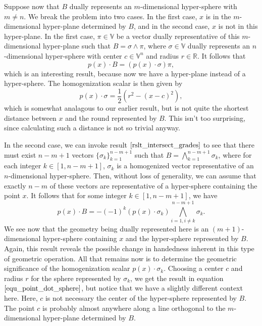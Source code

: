 \documentclass[12pt]{article}
\newcommand{\V}{\mathbb{V}}
\newcommand{\R}{\mathbb{R}}
\begin{document}
Suppose now that $B$ dually represents an $m$-dimensional
hyper-sphere with $m\neq n$.  We break the problem into
two cases.  In the first case, $x$ is in the $m$-dimensional
hyper-plane determined by $B$, and in the second case,
$x$ is not in this hyper-plane.  In the first case, $\pi\in\V$
be a vector dually representative of this $m$-dimensional
hyper-plane such that $B=\sigma\wedge\pi$, where $\sigma\in\V$
dually represents an $n$-dimensional hyper-sphere with center $c\in\V^n$
and radius $r\in\R$.  It follows that
\begin{equation*}
p(x)\cdot B = (p(x)\cdot\sigma)\pi,
\end{equation*}
which is an interesting result, because now we have a hyper-plane instead of a hyper-sphere.
The homogenization scalar is then given by
\begin{equation}\label{equ_point_dot_sphere}
p(x)\cdot\sigma = \frac{1}{2}(r^2-(x-c)^2),
\end{equation}
which is somewhat analagous to our earlier result, but is not quite the shortest
distance between $x$ and the round represented by $B$.  This isn't too surprising,
since calculating such a distance is not so trivial anyway.

In the second case, we can invoke result $\eqref{rslt_intersect_grades}$ to
see that there must exist $n-m+1$ vectors $\{\sigma_k\}_{k=1}^{n-m+1}$
such that $B=\bigwedge_{k=1}^{n-m+1}\sigma_k$, where for each
integer $k\in[1,n-m+1]$, $\sigma_k$ is a homogenized vector representative
of an $n$-dimensional hyper-sphere.  Then, without loss of generality,
we can assume that exactly $n-m$ of these vectors are representative
of a hyper-sphere containing the point $x$.  It follows that for some integer $k\in[1,n-m+1]$,
we have
\begin{equation*}
p(x)\cdot B = -(-1)^k(p(x)\cdot\sigma_k)\bigwedge_{i=1,i\neq k}^{n-m+1}\sigma_k.
\end{equation*}
We see now that the geometry being dually represented here is an $(m+1)$-dimensional
hyper-sphere containing $x$ and the hyper-sphere represented by $B$.  Again,
this result reveals the possible change in handedness inherent in this type of geometric operation.
All that remains now is to determine the geometric significance of the homogenization
scalar $p(x)\cdot\sigma_k$.  Choosing a center $c$ and radius $r$ for the sphere
represented by $\sigma_k$, we get the result in equation $\eqref{equ_point_dot_sphere}$,
but notice that we have a slightly different context here.  Here, $c$ is not necessary
the center of the hyper-sphere represented by $B$.  The point $c$ is probably
almost anywhere along a line orthogonal to the $m$-dimensional hyper-plane
determined by $B$.
\end{document}
